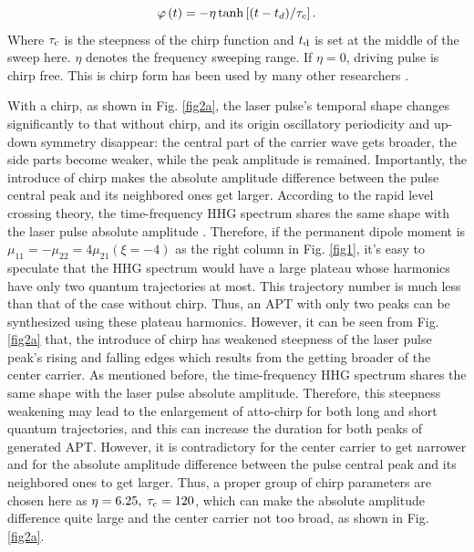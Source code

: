 \documentclass[10pt,letterpaper]{article}
\begin{document}
\begin{equation}
\varphi \left( t \right) =  - \eta \tanh \left[ {{{\left( {t - {t_d}} \right)} \mathord{\left/
			{\vphantom {{\left( {t - {t_d}} \right)} {{\tau _c}}}} \right.
			\kern-\nulldelimiterspace} {{\tau _c}}}} \right].
\label{eq15}
\end{equation}
Where $ \tau_{\rm{c}} $ is the steepness of the chirp function and $ t_{\rm{d}} $ is set at the middle of the sweep here. $ \eta $  denotes the frequency sweeping range. If $ \eta=0 $, driving pulse is chirp free. This is chirp form has been used by many other researchers \cite{Carrera-Chirp-PRA-2007,CuiNi2010NJP-wavelet,Chirp-Reference-2013PRA}.

With a chirp, as shown in Fig. \ref{fig2a}, the laser pulse's temporal shape changes significantly to that without chirp, and its origin oscillatory periodicity and up-down symmetry disappear: the central part of the carrier wave gets broader, the side parts become weaker, while the peak amplitude is remained. Importantly, the introduce of chirp makes the absolute amplitude difference between the pulse central peak and its neighbored ones get larger. According to the rapid level crossing theory, the time-frequency HHG spectrum shares the same shape with the laser pulse absolute amplitude \cite{CuiNi2010NJP-wavelet}. Therefore, if the permanent dipole moment is $\mu_{11}=-\mu_{22}=4\mu_{21}(\xi=-4)$ as the right column in Fig. \ref{fig1}, it's easy to speculate that the HHG spectrum would have a large plateau whose harmonics have only two quantum trajectories at most. This trajectory number is much less than that of the case without chirp. Thus, an APT with only two peaks can be synthesized using these plateau harmonics. However, it can be seen from Fig. \ref{fig2a} that, the introduce of chirp has weakened steepness of the laser pulse peak's rising and falling edges which results from the getting broader of the center carrier. As mentioned before, the time-frequency HHG spectrum shares the same shape with the laser pulse absolute amplitude. Therefore, this steepness weakening may lead to the enlargement of atto-chirp \cite{attochirp-ref1-2003,attochirp-ref2-2007,attochirp-ref3-2009} for both long and short quantum trajectories, and this can increase the duration for both peaks of generated APT. However, it is contradictory for the center carrier to get narrower and for the absolute amplitude difference between the pulse central peak and its neighbored ones to get larger. Thus, a proper group of chirp parameters are chosen here as $\eta=6.25,\;\tau_{\rm{c}}=120$, which can make the absolute amplitude difference quite large and the center carrier not too broad, as shown in Fig. \ref{fig2a}.
\end{document}
